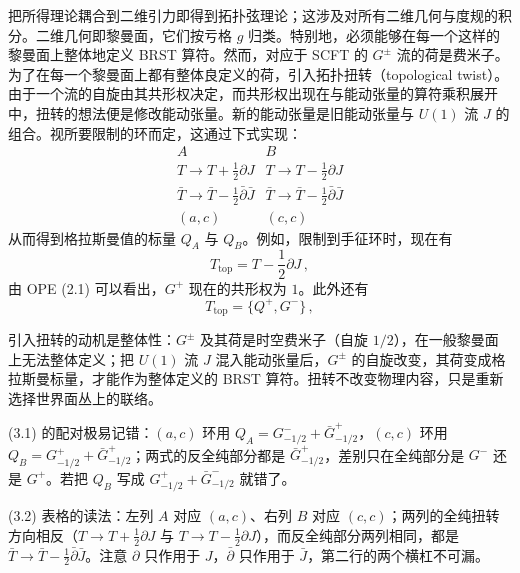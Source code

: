 把所得理论耦合到二维引力即得到拓扑弦理论；这涉及对所有二维几何与度规的积分。二维几何即黎曼面，它们按亏格 $g$ 归类。特别地，必须能够在每一个这样的黎曼面上整体地定义 BRST 算符。然而，对应于 SCFT 的 $G^{\pm}$ 流的荷是费米子。为了在每一个黎曼面上都有整体良定义的荷，引入拓扑扭转（topological twist）。由于一个流的自旋由其共形权决定，而共形权出现在与能动张量的算符乘积展开中，扭转的想法便是修改能动张量。新的能动张量是旧能动张量与 $U(1)$ 流 $J$ 的组合。视所要限制的环而定，这通过下式实现：
\begin{equation}\tag{3.2}
\begin{array}{c|c}
A & B\\ \hline
T\to T+\frac{1}{2}\partial J & T\to T-\frac{1}{2}\partial J\\[6pt]
\bar T\to\bar T-\frac{1}{2}\bar\partial\bar J & \bar T\to\bar T-\frac{1}{2}\bar\partial\bar J\\ \hline
{\scriptstyle(a,c)} & {\scriptstyle(c,c)}
\end{array}
\end{equation}
从而得到格拉斯曼值的标量 $Q_A$ 与 $Q_B$。例如，限制到手征环时，现在有
\begin{equation}\tag{3.3}
T_{\mathrm{top}}=T-\frac{1}{2}\partial J\,,
\end{equation}
由 OPE (2.1) 可以看出，$G^+$ 现在的共形权为 $1$。此外还有
\begin{equation}\tag{3.4}
T_{\mathrm{top}}=\{Q^{+},G^{-}\}\,,
\end{equation}

\begin{yizhu}[物理图像]
引入扭转的动机是整体性：$G^{\pm}$ 及其荷是时空费米子（自旋 $1/2$），在一般黎曼面上无法整体定义；把 $U(1)$ 流 $J$ 混入能动张量后，$G^{\pm}$ 的自旋改变，其荷变成格拉斯曼标量，才能作为整体定义的 BRST 算符。扭转不改变物理内容，只是重新选择世界面丛上的联络。
\end{yizhu}

\begin{yizhu}[易错点]
(3.1) 的配对极易记错：$(a,c)$ 环用 $Q_A=G^{-}_{-1/2}+\bar G^{+}_{-1/2}$，$(c,c)$ 环用 $Q_B=G^{+}_{-1/2}+\bar G^{+}_{-1/2}$；两式的反全纯部分都是 $\bar G^{+}_{-1/2}$，差别只在全纯部分是 $G^{-}$ 还是 $G^{+}$。若把 $Q_B$ 写成 $G^{+}_{-1/2}+\bar G^{-}_{-1/2}$ 就错了。
\end{yizhu}

\begin{yizhu}[易错点]
(3.2) 表格的读法：左列 $A$ 对应 $(a,c)$、右列 $B$ 对应 $(c,c)$；两列的全纯扭转方向相反（$T\to T+\tfrac{1}{2}\partial J$ 与 $T\to T-\tfrac{1}{2}\partial J$），而反全纯部分两列相同，都是 $\bar T\to\bar T-\tfrac{1}{2}\bar\partial\bar J$。注意 $\partial$ 只作用于 $J$，$\bar\partial$ 只作用于 $\bar J$，第二行的两个横杠不可漏。
\end{yizhu}

